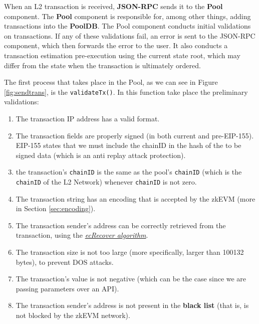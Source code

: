When an L2 transaction is received, \textbf{JSON-RPC} sends it to the \textbf{Pool} component. The \textbf{Pool} component is responsible for, among other things, adding transactions into the \textbf{PoolDB}. The Pool component conducts initial validations on transactions. If any of these validations fail, an error is sent to the JSON-RPC component, which then forwards the error to the user. It also conducts a transaction estimation pre-execution using the current state root, which may differ from the state when the transaction is ultimately ordered.

The first process that takes place in the Pool, as we can see in Figure \ref{fig:sendtrans}, is the \texttt{validateTx()}. In this function take place the preliminary validations:

\begin{enumerate}
\item The transaction IP address has a valid format.

\item The transaction fields are properly signed (in both current and pre-EIP-155). EIP-155 states that we must include the chainID in the hash of the to be signed data (which is an anti replay attack protection).

\item the transaction's \texttt{chainID} is the same as the pool's \texttt{chainID} (which is the \texttt{chainID} of the L2 Network) whenever \texttt{chainID} is not zero.

\item The transaction string has an encoding that is accepted by the zkEVM (more in Section \ref{sec:encoding}). \label{item:encoding}

\item The transaction sender's address can be correctly retrieved from the transaction, using the \href{https://en.wikipedia.org/wiki/Elliptic_Curve_Digital_Signature_Algorithm\#Public_key_recovery}{\textit{ecRecover algorithm}}.

\item The transaction size is not too large (more specifically, larger than 100132 bytes), to prevent DOS attacks.

\item The transaction's value is not negative (which can be the case since we are passing parameters over an API).

\item The transaction sender's address is not present in the \textbf{black list} (that is, is not blocked by the
zkEVM network).


\end{enumerate}
